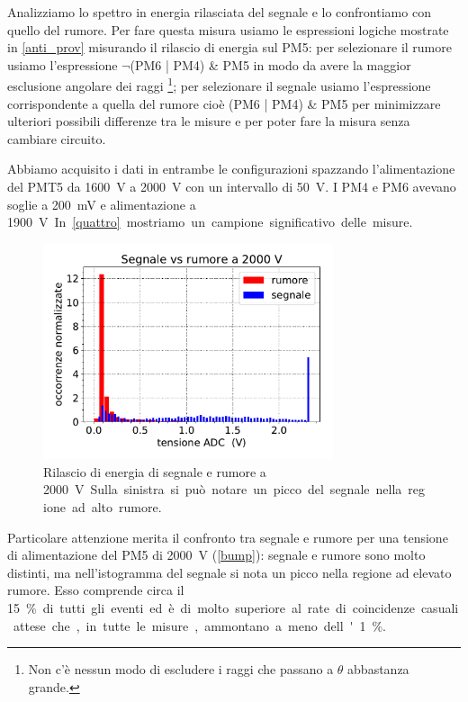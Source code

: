 Analizziamo lo spettro in energia rilasciata del segnale e lo confrontiamo con quello del rumore.
Per fare questa misura usiamo le espressioni logiche mostrate in \autoref{anti_prov}
misurando il rilascio di energia sul PM5:
per selezionare il rumore usiamo l'espressione $\neg$(PM6 | PM4) \& PM5
in modo da avere la maggior esclusione angolare dei raggi%
\footnote{Non c'è nessun modo di escludere i raggi che passano a $\theta$ abbastanza grande.};
per selezionare il segnale usiamo l'espressione corrispondente a quella del rumore cioè (PM6 | PM4) \& PM5
per minimizzare ulteriori possibili differenze tra le misure
e per poter fare la misura senza cambiare circuito.

Abbiamo acquisito i dati in entrambe le configurazioni spazzando
l'alimentazione del PMT5 da \SI{1600}{V} a \SI{2000}{V} con un intervallo di \SI{50}{V}.
I PM4 e PM6 avevano soglie a \SI{200}{mV} e alimentazione a \SI{1900}V.
In \autoref{quattro} mostriamo un campione significativo delle misure.

\begin{figure}
	\centering
	\includegraphics[width=23em]{2000}
	\caption{Rilascio di energia di segnale e rumore a \SI{2000}V.
	Sulla sinistra si può notare un picco del segnale nella regione ad alto rumore.}
	\label{bump}
\end{figure}

Particolare attenzione merita il confronto tra segnale e rumore
per una tensione di alimentazione del PM5 di \SI{2000}{V} (\autoref{bump}):
segnale e rumore sono molto distinti, ma nell'istogramma del segnale si nota un picco nella regione ad elevato rumore.
Esso comprende circa il \SI{15}\% di tutti gli eventi
ed è di molto superiore al rate di coincidenze casuali attese che,
in tutte le misure, ammontano a meno dell'1\%.
